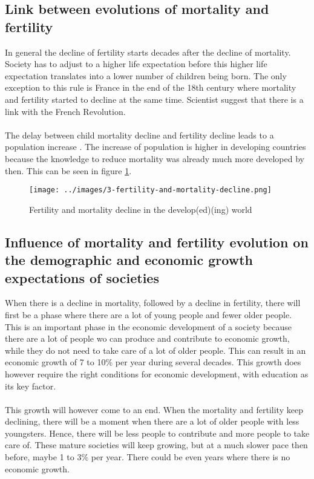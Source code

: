 \documentclass[../summary.tex]{subfiles}
\begin{document}
	\subsection{Link between evolutions of mortality and fertility}
	In general the decline of fertility starts decades after the decline of mortality. Society has to adjust to a higher life expectation before this higher life expectation translates into a lower number of children being born. The only exception to this rule is France in the end of the 18th century where mortality and fertility started to decline at the same time. Scientist suggest that there is a link with the French Revolution. 
	\\
	\\
	The delay between child mortality decline and fertility decline leads to a population increase . The increase of population is higher in developing countries because the knowledge to reduce mortality  was already much more developed by then. This can be seen in figure \ref{fig:fertility-and-mortality-decline}.
	
	\begin{figure}[H]
		\centering
		\texttt{[image: ../images/3-fertility-and-mortality-decline.png]}
		\caption{Fertility and mortality decline in the develop(ed)(ing) world}
		\label{fig:fertility-and-mortality-decline}
	\end{figure}
	
	
	\subsection{Influence of mortality and fertility evolution on the demographic and economic growth expectations of societies}
	When there is a decline in mortality, followed by a decline in fertility, there will first be a phase where there are a lot of young people and fewer older people. This is an important phase in the economic development of a society because there are a lot of people wo can produce and contribute to economic growth, while they do not need to take care of a lot of older people. This can result in an economic growth of 7 to 10\% per year during several decades. This growth does however require the right conditions for economic development, with education as its key factor.
	\\
	\\
	This growth will however come to an end. When the mortality and fertility keep declining, there will be a moment when there are a lot of older people with less youngsters. Hence, there will be less people to contribute and more people to take care of. These mature societies will keep growing, but at a much slower pace then before, maybe 1 to 3\% per year. There could be even years where there is no economic growth.
	
\end{document}
